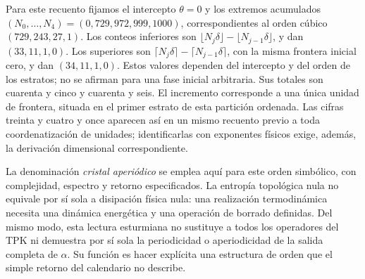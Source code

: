 

Para este recuento fijamos el intercepto \(\theta=0\) y los extremos acumulados \((N_0,\ldots,N_4)=(0,729,972,999,1000)\), correspondientes al orden cúbico \((729,243,27,1)\). Los conteos inferiores son \(\lfloor N_j\delta\rfloor-\lfloor N_{j-1}\delta\rfloor\), y dan \((33,11,1,0)\). Los superiores son \(\lceil N_j\delta\rceil-\lceil N_{j-1}\delta\rceil\), con la misma frontera inicial cero, y dan \((34,11,1,0)\). Estos valores dependen del intercepto y del orden de los estratos; no se afirman para una fase inicial arbitraria. Sus totales son cuarenta y cinco y cuarenta y seis. El incremento corresponde a una única unidad de frontera, situada en el primer estrato de esta partición ordenada. Las cifras treinta y cuatro y once aparecen así en un mismo recuento previo a toda coordenatización de unidades; identificarlas con exponentes físicos exige, además, la derivación dimensional correspondiente.

La denominación \emph{cristal aperiódico} se emplea aquí para este orden simbólico, con complejidad, espectro y retorno especificados. La entropía topológica nula no equivale por sí sola a disipación física nula: una realización termodinámica necesita una dinámica energética y una operación de borrado definidas. Del mismo modo, esta lectura esturmiana no sustituye a todos los operadores del TPK ni demuestra por sí sola la periodicidad o aperiodicidad de la salida completa de \(\alpha\). Su función es hacer explícita una estructura de orden que el simple retorno del calendario no describe.




